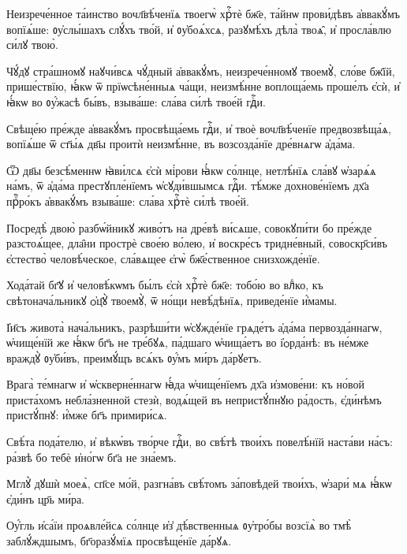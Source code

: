 \hKv Неизрече́нное та́инство вочл҃вѣ́ченїѧ твоегѡ̀ хрⷭ҇тѐ бж҃е,  та́йнѡ прови́дѣвъ а҆ввакꙋ́мъ вопїѧ́ше: ᲂу҆слы́шахъ слꙋ́хъ  тво́й, и҆ ᲂу҆боѧ́хсѧ, разꙋмѣ́хъ дѣла̀ твоѧ̑, и҆  просла́влю си́лꙋ твою̀. 

\hKv Чꙋ́дꙋ стра́шномꙋ наꙋчи́всѧ чꙋ́дный а҆ввакꙋ́мъ,  неизрече́нномꙋ твоемꙋ̀, сло́ве бж҃їй, прише́ствїю, ꙗ҆́кѡ  ѿ прїѡсѣне́нныѧ ча́щи, неизмѣ́нне воплоща́емь проше́лъ  є҆сѝ, и҆ ꙗ҆́кѡ во ᲂу҆́жасѣ бы́въ, взыва́ше: сла́ва  си́лѣ твое́й гдⷭ҇и.  

\hKv Свѣще́ю пре́жде а҆ввакꙋ́мъ просвѣща́емь гдⷭ҇и, и҆ твоѐ  вочл҃вѣ́ченїе предвозвѣща́ѧ, вопїѧ́ше ѿ ст҃ы́ѧ дв҃ы  проитѝ неизмѣ́нне, въ возсозда́нїе дре́внѧгѡ а҆да́ма. 

\hKv Ѿ дв҃ы безсѣ́меннѡ ꙗ҆ви́лсѧ є҆сѝ мі́рови ꙗ҆́кѡ  со́лнце, нетлѣ́нїѧ сла́вꙋ ѡ҆зарѧ́ѧ на́мъ, ѿ а҆да́ма  престꙋпле́нїемъ ѡ҆сꙋди́вшымсѧ гдⷭ҇и. тѣ́мже дохнове́нїемъ  дх҃а прⷪ҇ро́къ а҆ввакꙋ́мъ взыва́ше: сла́ва хрⷭ҇тѐ си́лѣ  твое́й. 

\hKv Посредѣ̀ двою̀ разбѡ́йникꙋ живо́тъ на дре́вѣ ви́сѧше,  совокꙋпи́ти бо пре́жде разстоѧ́щее, дла̑ни прострѐ свое́ю  во́лею, и҆ воскре́съ тридне́вный, совоскр҃си́въ є҆стество̀  человѣ́ческое, сла́вѧщее є҆гѡ̀ бж҃е́ственное  снизхожде́нїе. 
%

\hKv Хода́тай бг҃ꙋ и҆ человѣ́кѡмъ бы́лъ є҆сѝ хрⷭ҇тѐ бж҃е:  тобо́ю во влⷣко, къ свѣтонача́льникꙋ ѻ҆ц҃ꙋ̀ твоемꙋ̀, ѿ  но́щи невѣ́дѣнїѧ, приведе́нїе и҆́мамы.  
%

\hKv І҆и҃съ живота̀ нача́льникъ, разрѣши́ти  ѡ҆сꙋжде́нїе грѧде́тъ а҆да́ма первозда́ннагѡ, ѡ҆чище́нїй же  ꙗ҆́кѡ бг҃ъ не тре́бꙋѧ, па́дшаго ѡ҆чища́етъ во і҆ѻрда́нѣ:  въ не́мже враждꙋ̀ ᲂу҆би́въ, преимꙋ́щъ всѧ́къ ᲂу҆́мъ ми́ръ  да́рꙋетъ.  

\hKv Врага̀ те́мнагѡ и҆ ѡ҆скверне́ннагѡ ꙗ҆́да ѡ҆чище́нїемъ дх҃а  и҆змове́ни: къ но́вой приста́хомъ небла́зненной стезѝ,  водѧ́щей въ непристꙋ́пнꙋю ра́дость, є҆ди́нѣмъ пристꙋ́пнꙋ:  и҆́мже бг҃ъ примири́сѧ. 
%

\hKv Свѣ́та пода́телю, и҆ вѣкѡ́въ тво́рче гдⷭ҇и, во свѣ́тѣ  твои́хъ повелѣ́нїй наста́ви на́съ: ра́звѣ бо тебѐ и҆но́гѡ  бг҃а не зна́емъ. 
%

\hKv Мглꙋ̀ дꙋшѝ моеѧ̀, сп҃се мо́й, разгна́въ свѣ́томъ  за́повѣдей твои́хъ, ѡ҆зари́ мѧ ꙗ҆́кѡ є҆ди́нъ цр҃ь ми́ра. 

\hKv Оу҆́гль и҆са́їи проѧвле́йсѧ со́лнце и҆з̾ дѣ́вственныѧ  ᲂу҆тро́бы возсїѧ̀ во тмѣ̀ заблꙋ́ждшымъ, бг҃оразꙋ́мїѧ  просвѣще́нїе да́рꙋѧ.  

